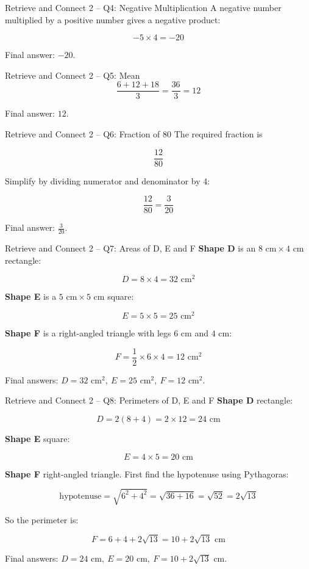 \documentclass{beamer}
\begin{document}
\begin{frame}{Retrieve and Connect 2 -- Q4: Negative Multiplication}
\small
A negative number multiplied by a positive number gives a negative product:

\[
-5 \times 4 = -20
\]

Final answer: \(\boxed{-20}\).
\end{frame}

\begin{frame}{Retrieve and Connect 2 -- Q5: Mean}
\small
\[
\frac{6+12+18}{3}=\frac{36}{3}=12
\]

Final answer: \(\boxed{12}\).
\end{frame}

\begin{frame}{Retrieve and Connect 2 -- Q6: Fraction of 80}
\small
The required fraction is

\[
\frac{12}{80}
\]

Simplify by dividing numerator and denominator by 4:

\[
\frac{12}{80}=\frac{3}{20}
\]

Final answer: \(\boxed{\frac{3}{20}}\).
\end{frame}

\begin{frame}{Retrieve and Connect 2 -- Q7: Areas of D, E and F}
\small
\textbf{Shape D} is an \(8\text{ cm}\times 4\text{ cm}\) rectangle:

\[
D=8\times 4=32\text{ cm}^2
\]

\textbf{Shape E} is a \(5\text{ cm}\times 5\text{ cm}\) square:

\[
E=5\times 5=25\text{ cm}^2
\]

\textbf{Shape F} is a right-angled triangle with legs \(6\text{ cm}\) and \(4\text{ cm}\):

\[
F=\frac12 \times 6 \times 4=12\text{ cm}^2
\]

Final answers: \(\boxed{D=32\text{ cm}^2,\ E=25\text{ cm}^2,\ F=12\text{ cm}^2}\).
\end{frame}

\begin{frame}{Retrieve and Connect 2 -- Q8: Perimeters of D, E and F}
\small
\textbf{Shape D} rectangle:

\[
D=2(8+4)=2\times 12=24\text{ cm}
\]

\textbf{Shape E} square:

\[
E=4\times 5=20\text{ cm}
\]

\textbf{Shape F} right-angled triangle. First find the hypotenuse using Pythagoras:

\[
\text{hypotenuse}=\sqrt{6^2+4^2}=\sqrt{36+16}=\sqrt{52}=2\sqrt{13}
\]

So the perimeter is:

\[
F=6+4+2\sqrt{13}=10+2\sqrt{13}\text{ cm}
\]

Final answers: \(\boxed{D=24\text{ cm},\ E=20\text{ cm},\ F=10+2\sqrt{13}\text{ cm}}\).
\end{frame}
\end{document}
